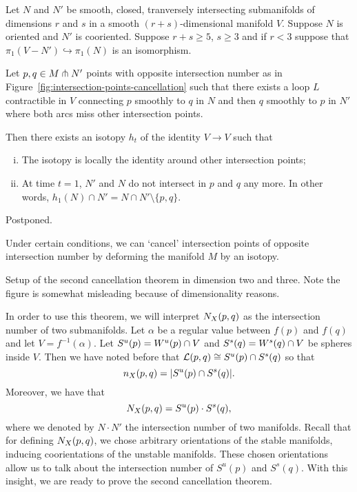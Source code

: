 \begin{theorem}[Whitney]
    Let $N$ and  $N'$ be smooth, closed, tranversely intersecting submanifolds of dimensions  $r$ and $s$ in a smooth  $(r+s)$-dimensional manifold $V$.
    Suppose  $N$ is oriented and  $N'$ is cooriented.
    Suppose $r+s \ge 5$, $s\ge 3$ and if $r<3$ suppose that $\pi_1(V - N') \hookrightarrow \pi_1(N)$ is an isomorphism.

    Let $p, q \in  M \pitchfork N'$ points with opposite intersection number as in Figure~\ref{fig:intersection-points-cancellation} such that there exists a loop $L$ contractible in  $V$ connecting  $p$ smoothly to $q$ in  $N$  and then $q$ smoothly to  $p$ in $N'$ where both arcs miss other intersection points.

    Then there exists an isotopy $h_t$ of the identity $V \to V$ such that
    \begin{enumerate}[(i)]
        \item The isotopy is locally the identity around other intersection points;
        \item At time  $t = 1$,  $N'$ and  $N$ do not intersect in $p$ and $q$  any more.  In other words, $h_1(N) \cap N' = N \cap  N' \setminus \{ p, q\} $.
    \end{enumerate}
\end{theorem}
\begin{myproof}
    Postponed.
\end{myproof}
\begin{marginfigure}[-6.5cm]
    \centering
    \caption{
    Under certain conditions, we can `cancel' intersection points of opposite intersection number by deforming the manifold $M$ by an isotopy.}
    \label{fig:intersection-points-cancellation}
\end{marginfigure}

\begin{marginfigure}
    \centering
    \caption{Setup of the second cancellation theorem in dimension two and three. Note the figure is somewhat misleading because of dimensionality reasons.}
    \label{fig:second-cancellation-theorem-setup}
\end{marginfigure}
In order to use this theorem, we will interpret $N_{X}(p, q)$ as the intersection number of two submanifolds.
Let $\alpha$ be a regular value between  $f(p)$ and  $f(q)$ and let $V = f^{-1}(\alpha)$.
Let $S^{u}(p) = W^u(p) \cap V$ and 
$S^{s}(q) = W^s(q) \cap V$ be spheres inside $V$.
Then we have noted before that $\mathcal L(p, q) \cong S^{u}(p) \cap S^{s}(q)$ so that \[
    n_{X}(p, q) = |S^{u}(p) \cap S^{s}(q)|.
\]
Moreover, we have that
\[
    N_{X}(p, q) = S^{u}(p) \cdot S^{s}(q)
,\] 
where we denoted by $N \cdot N'$ the intersection number of two manifolds.
Recall that for defining $N_{X}(p, q)$,
we chose arbitrary orientations of the stable manifolds, inducing coorientations of the unstable manifolds.
These chosen orientations allow us to talk about the intersection number of $S^{u}(p)$ and $S^{s}(q)$.
With this insight, we are ready to prove the second cancellation theorem.

